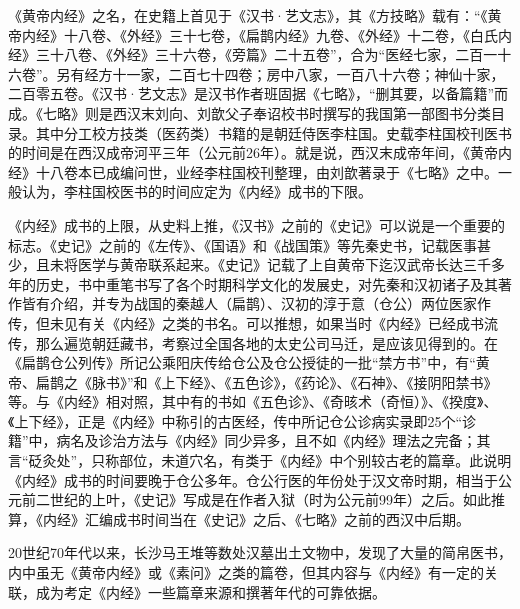 \documentclass[draft,12pt]{ctexbook}
\begin{document}
《黄帝内经》之名，在史籍上首见于《汉书·艺文志》，其《方技略》载有：“《黄帝内经》十八卷、《外经》三十七卷，《扁鹊内经》九卷、《外经》十二卷，《白氏内经》三十八卷、《外经》三十六卷，《旁篇》二十五卷”，合为“医经七家，二百一十六卷”。另有经方十一家，二百七十四卷；房中八家，一百八十六卷；神仙十家，二百零五卷。《汉书·艺文志》是汉书作者班固据《七略》，“删其要，以备篇籍”而成。《七略》则是西汉末刘向、刘歆父子奉诏校书时撰写的我国第一部图书分类目录。其中分工校方技类（医药类）书籍的是朝廷侍医李柱国。史载李柱国校刊医书的时间是在西汉成帝河平三年（公元前26年）。就是说，西汉末成帝年间，《黄帝内经》十八卷本已成编问世，业经李柱国校刊整理，由刘歆著录于《七略》之中。一般认为，李柱国校医书的时间应定为《内经》成书的下限。

《内经》成书的上限，从史料上推，《汉书》之前的《史记》可以说是一个重要的标志。《史记》之前的《左传》、《国语》和《战国策》等先秦史书，记载医事甚少，且未将医学与黄帝联系起来。《史记》记载了上自黄帝下迄汉武帝长达三千多年的历史，书中重笔书写了各个时期科学文化的发展史，对先秦和汉初诸子及其著作皆有介绍，并专为战国的秦越人（扁鹊）、汉初的淳于意（仓公）两位医家作传，但未见有关《内经》之类的书名。可以推想，如果当时《内经》已经成书流传，那么遍览朝廷藏书，考察过全国各地的太史公司马迁，是应该见得到的。在《扁鹊仓公列传》所记公乘阳庆传给仓公及仓公授徒的一批“禁方书”中，有“黄帝、扁鹊之《脉书》”和《上下经》、《五色诊》，《药论》、《石神》、《接阴阳禁书》等。与《内经》相对照，其中有的书如《五色诊》、《奇晐术（奇恒）》、《揆度》、《上下经》，正是《内经》中称引的古医经，传中所记仓公诊病实录即25个“诊籍”中，病名及诊治方法与《内经》同少异多，且不如《内经》理法之完备；其言“砭灸处”，只称部位，未道穴名，有类于《内经》中个别较古老的篇章。此说明《内经》成书的时间要晚于仓公多年。仓公行医的年份处于汉文帝时期，相当于公元前二世纪的上叶，《史记》写成是在作者入狱（时为公元前99年）之后。如此推算，《内经》汇编成书时间当在《史记》之后、《七略》之前的西汉中后期。

20世纪70年代以来，长沙马王堆等数处汉墓出土文物中，发现了大量的简帛医书，内中虽无《黄帝内经》或《素问》之类的篇卷，但其内容与《内经》有一定的关联，成为考定《内经》一些篇章来源和撰著年代的可靠依据。
\end{document}
